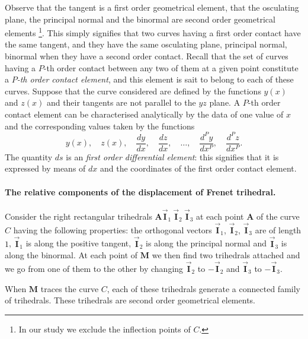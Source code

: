 \documentclass[leqno,11pt]{book}
\numberwithin{equation}{chapter}
\theoremstyle{shape1}
\theoremstyle{shapesmall}
\newcommand{\rvec}[1]{\vec{\mathbf{#1}}}
\newcommand{\ivec}{\rvec{I}}
\begin{document}
Observe that the tangent is a first order geometrical element, that the osculating plane, the principal normal and the binormal are second order geometrical elements \footnote{In our study we exclude the inflection points of $C$.}. This simply signifies that two curves having a first order contact have the same tangent, and they have the same osculating plane, principal normal, binormal when they have a second order contact. Recall that the set of curves having a $P$-th order contact between any two of them at a given point constitute a \emph{$P$-th order contact element}, and this element is sait to belong to each of these curves. Suppose that the curve considered are defined by the functions $y(x)$ and $z(x)$ and their tangents are not parallel to the $yz$ plane. A $P$-th order contact element can be characterised analytically by the data of one value of $x$ and the corresponding values taken by the functions
\[
y(x),\quad z(x),\quad \frac{dy}{dx},\quad \frac{dz}{dx},\quad\dots,\quad\frac{d^{P}y}{dx^{P}},\quad \frac{d^{P}z}{dx^{P}}.
\]
The quantity $ds$ is an \emph{first order differential element}: this signifies that it is expressed by means of $dx$ and the coordinates of the first order contact element.

\paragraph{The relative components of the displacement of Frenet trihedral.}
\label{sec:10}
Consider the right rectangular trihedrals $\mathbf{A}\ivec_{1}\ \ivec_{2}\ \ivec_{3}$ at each point $\mathbf{A}$ of the curve $C$ having the following properties: the orthogonal vectors $\ivec_{1}$, $\ivec_{2}$, $\ivec_{3}$ are of length $1$, $\ivec_{1}$ is along the positive tangent, $\ivec_{2}$ is along the principal normal and $\ivec_{3}$ is along the binormal. At each point of $\mathbf{M}$ we then find two trihedrals attached and we go from one of them to the other by changing $\ivec_{2}$ to $-\ivec_{2}$ and $\ivec_{3}$ to $-\ivec_{3}$.

When $\mathbf{M}$ traces the curve $C$, each of these trihedrals generate a connected family of trihedrals. These trihedrals are second order geometrical elements.
\end{document}
